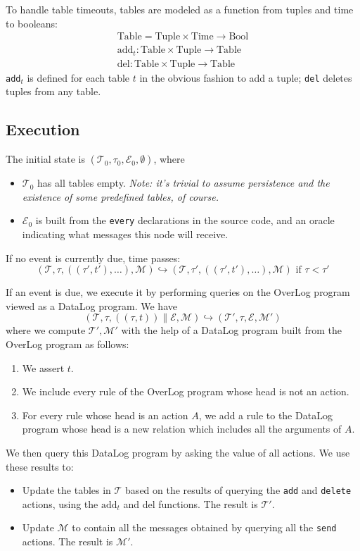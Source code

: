 \documentclass{article}
\newcommand{\code}[1]{{\tt \small #1}}
\newcommand{\T}{\mathcal{T}}
\newcommand{\E}{\mathcal{E}}
\newcommand{\M}{\mathcal{M}}
\begin{document}
To handle table timeouts, tables are modeled as a function from tuples and
time to booleans: 
\begin{eqnarray*}
  \mbox{Table} = \mbox{Tuple} \times \mbox{Time} \rightarrow \mbox{Bool} \\
  \mbox{add}_t : \mbox{Table} \times \mbox{Tuple} \rightarrow \mbox{Table} \\
  \mbox{del} : \mbox{Table} \times \mbox{Tuple} \rightarrow \mbox{Table}
\end{eqnarray*}
\code{add}$_t$ is defined for each table $t$ in the obvious fashion to add a
tuple; \code{del} deletes tuples from any table.

\subsection{Execution}

The initial state is $(\T_0, \tau_0, \E_0, \emptyset)$, where
\begin{itemize}
\item $\T_0$ has all tables empty. \emph{Note: it's trivial to assume
persistence and the existence of some predefined tables, of course.}

\item $\E_0$ is built from the \code{every} declarations in the source
code, and an oracle indicating what messages this node will receive.
\end{itemize}

If no event is currently due, time passes:
\[
  (\T, \tau, ((\tau', t'), \ldots), \M) \hookrightarrow (\T, \tau', ((\tau', t'), \ldots), \M)  \mbox{ if } \tau < \tau'
\]

If an event is due, we execute it by performing queries on the OverLog
program viewed as a DataLog program. We have
\[
  (\T, \tau, ((\tau, t)) \parallel \E, \M) \hookrightarrow (\T', \tau, \E, \M')
\]
where we compute $\T', \M'$ with the help of a DataLog program built from
the OverLog program as follows:
\begin{enumerate}
\item We assert $t$.
\item We include every rule of the OverLog program whose head is
not an action.
\item For every rule whose head is an action $A$, we add a rule
to the DataLog program whose head is a new relation which includes
all the arguments of $A$. 
\end{enumerate}

We then query this DataLog program by asking the value of all actions. We
use these results to:
\begin{itemize}
\item Update the tables in $\T$ based on the results of querying the
\code{add} and \code{delete} actions, using the $\mbox{add}_t$ and
\mbox{del} functions. The result is $\T'$.
\item Update $\M$ to contain all the messages obtained by querying all
the \code{send} actions. The result is $\M'$.
\end{itemize}
\end{document}

